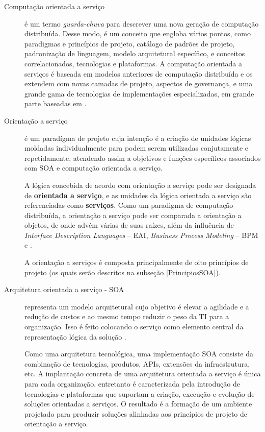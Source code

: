 \begin{description}
\item [Computação orientada a serviço] é um termo \textit{guarda-chuva} para
descrever uma nova geração de computação distribuída. Desse modo, é um conceito
que engloba vários pontos, como paradigmas e princípios de projeto, catálogo de
padrões de projeto, padronização de linguagem, modelo arquitetural específico, e
conceitos correlacionados, tecnologias e plataformas.
A computação orientada a serviços é baseada em modelos anteriores de computação
distribuída e os extendem com novas camadas de projeto, aspectos de governança,
e uma grande gama de tecnologias de implementações especializadas, em grande
parte baseadas em \ws{} \cite{erl2009web}.

\item [Orientação a serviço] é um paradígma de projeto cuja intenção é a criação
de unidades lógicas moldadas individualmente para podem serem utilizadas
conjutamente e repetidamente, atendendo assim a objetivos e
funções específicos associados com SOA e computação orientada a serviço.

A lógica concebida de acordo com orientação a serviço pode ser designada de
\textbf{orientada a serviço}, e as unidades da lógica orientada a serviço são
referenciadas como \textbf{serviços}. Como um paradigma de computação
distribuída, a orientação a serviço pode ser comparada a orientação a objetos,
de onde advém várias de suas raízes, além da influência de
\textit{Interface Description Languages} -- EAI,
\textit{Business Process Modeling} -- BPM e \ws \cite{erl2009web}.

A orientação a serviços é composta principalmente de oito princípios de projeto
(os quais serão descritos na subseção \ref{PrincipiosSOA}).

\item [Arquitetura orientada a serviço - SOA] representa um modelo arquitetural
cujo objetivo é elevar a agilidade e a redução de custos e ao mesmo tempo
reduzir o peso da TI para a organização. Isso é feito colocando o serviço
como elemento central da representação lógica da solução \cite{erl2009web}.

Como uma arquitetura tecnológica, uma implementação SOA consiste da combinação
de tecnologias, produtos, APIs, extensões da infraestrutura, etc. A implantação
concreta de uma arquitetura orientada a serviço é única para cada organização,
entretanto é caracterizada pela introdução de tecnologias e plataformas que
suportam a criação, execução e evolução de soluções orientadas a serviços. O
resultado é a formação de um ambiente projetado para produzir soluções alinhadas
aos princípios de projeto de orientação a serviço.


\end{description}
